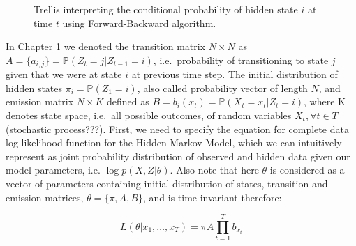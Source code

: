 \begin{figure}[htbp]
\begin{center}
\end{center}
\caption{Trellis interpreting the conditional probability of hidden state $i$ at time $t$ using Forward-Backward algorithm.}
\end{figure}

In Chapter 1 we denoted the transition matrix $N{\times}N$ as $A=\{a_{i,j}\}=\mathbb{P}(Z_{t}=j|Z_{t-1}=i)$, i.e.\ probability of transitioning to state $j$ given that we were at state $i$ at previous time step. The initial distribution of hidden states $\pi_i = \mathbb{P}(Z_1=i)$, also called probability vector of length $N$, and emission matrix $N{\times}K$ defined as $B=b_i(x_t) = \mathbb{P}(X_t=x_t|Z_t=i)$, where K denotes state space, i.e.\ all possible outcomes, of random variables $X_t, \forall t \in T$ (stochastic process???). First, we need to specify the equation for complete data log-likelihood function for the Hidden Markov Model, which we can intuitively represent as joint probability distribution of observed and hidden data given our model parameters, i.e. $\log p(X,Z|\theta)$. Also note that here $\theta$ is considered as a vector of parameters containing initial distribution of states, transition and emission matrices, $\theta = \{\pi, A,B\}$, and is time invariant therefore:

\begin{equation}
L(\theta|x_1,\ldots,x_T) = \pi A \prod_{t=1}^{T} b_{x_t}
\end{equation}


